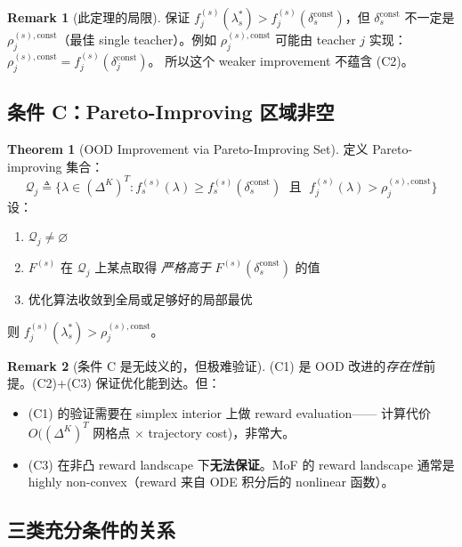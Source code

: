 \documentclass[11pt,a4paper]{article}
\newcommand{\const}{\mathrm{const}}
\theoremstyle{definition}
\newtheorem{remark}{Remark}
\newtheorem{theorem}{Theorem}
\begin{document}
\begin{remark}[此定理的局限]
保证 $f_j^{(s)}(\lambda_s^*) > f_j^{(s)}(\delta_s^\const)$，但 $\delta_s^\const$
不一定是 $\rho_j^{(s),\const}$（最佳 single teacher）。例如 $\rho_j^{(s),\const}$
可能由 teacher $j$ 实现：$\rho_j^{(s),\const} = f_j^{(s)}(\delta_j^\const)$。
所以这个 weaker improvement 不蕴含 (C2)。
\end{remark}

\subsection{条件 C：Pareto-Improving 区域非空}

\begin{theorem}[OOD Improvement via Pareto-Improving Set]
\label{thm:pareto_set}
定义 Pareto-improving 集合：
\begin{equation}
\mathcal{Q}_{j} \triangleq \big\{\lambda \in (\Delta^K)^T : f_s^{(s)}(\lambda) \geq f_s^{(s)}(\delta_s^\const) \;\text{ 且 }\; f_j^{(s)}(\lambda) > \rho_j^{(s),\const}\big\}
\label{eq:Q_j}
\end{equation}
设：
\begin{enumerate}[leftmargin=1.5em]
\item[(C1)] $\mathcal{Q}_j \neq \varnothing$
\item[(C2)] $F^{(s)}$ 在 $\mathcal{Q}_j$ 上某点取得 \emph{严格高于} $F^{(s)}(\delta_s^\const)$ 的值
\item[(C3)] 优化算法收敛到全局或足够好的局部最优
\end{enumerate}
则 $f_j^{(s)}(\lambda_s^*) > \rho_j^{(s),\const}$。
\end{theorem}

\begin{remark}[条件 C 是无歧义的，但极难验证]
(C1) 是 OOD 改进的\emph{存在性}前提。(C2)+(C3) 保证优化能到达。但：
\begin{itemize}[leftmargin=1.5em]
\item (C1) 的验证需要在 simplex interior 上做 reward evaluation——
计算代价 $O((\Delta^K)^T$ 网格点 $\times$ trajectory cost)，非常大。
\item (C3) 在非凸 reward landscape 下\textbf{无法保证}。MoF 的 reward
landscape 通常是 highly non-convex（reward 来自 ODE 积分后的 nonlinear 函数）。
\end{itemize}
\end{remark}

\subsection{三类充分条件的关系}
\end{document}
